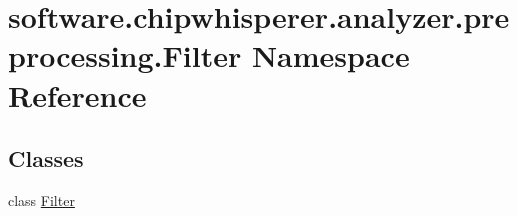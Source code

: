 \hypertarget{namespacesoftware_1_1chipwhisperer_1_1analyzer_1_1preprocessing_1_1Filter}{}\section{software.\+chipwhisperer.\+analyzer.\+preprocessing.\+Filter Namespace Reference}
\label{namespacesoftware_1_1chipwhisperer_1_1analyzer_1_1preprocessing_1_1Filter}
\subsection*{Classes}
\begin{DoxyCompactItemize}
\item 
class \hyperlink{classsoftware_1_1chipwhisperer_1_1analyzer_1_1preprocessing_1_1Filter_1_1Filter}{Filter}
\end{DoxyCompactItemize}
